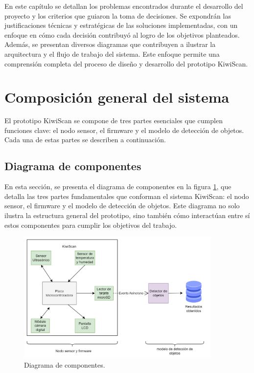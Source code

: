 
En este capítulo se detallan los problemas encontrados durante el desarrollo del proyecto y los criterios que guiaron la toma de decisiones. Se expondrán las justificaciones técnicas y estratégicas de las soluciones implementadas, con un enfoque en cómo cada decisión contribuyó al logro de los objetivos planteados. Además, se presentan diversos diagramas que contribuyen a ilustrar la arquitectura y el flujo de trabajo del sistema. Este enfoque permite una comprensión completa del proceso de diseño y desarrollo del prototipo KiwiScan.

\section{Composición general del sistema}

El prototipo KiwiScan se compone de tres partes esenciales que cumplen funciones clave: el nodo sensor, el firmware y el modelo de detección de objetos. Cada una de estas partes se describen a continuación. 

\subsection{Diagrama de componentes}

En esta sección, se presenta el diagrama de componentes en la figura \ref{fig:diagrama_de_componentes}, que detalla las tres partes fundamentales que conforman el sistema KiwiScan: el nodo sensor, el firmware y el modelo de detección de objetos. Este diagrama no solo ilustra la estructura general del prototipo, sino también cómo interactúan entre sí estos componentes para cumplir los objetivos del trabajo.

\newpage

\vspace{1cm}

\begin{figure}[htbp]
	\centering
	\includegraphics[width=0.9\textwidth, height=0.45\textheight]{./Figures/diagrama_de_componentes.png}
	\caption{Diagrama de componentes.}
	\label{fig:diagrama_de_componentes}
\end{figure}

